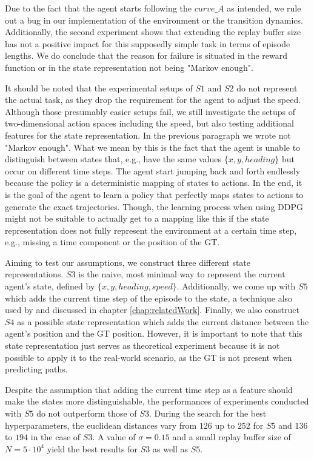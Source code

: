 Due to the fact that the agent starts following the $curve\_A$ as intended, we rule out a bug in our implementation of the environment or the transition dynamics. Additionally, the second experiment shows that extending the replay buffer size has not a positive impact for this supposedly simple task in terms of episode lengths. We do conclude that the reason for failure is situated in the reward function or in the state representation not being "Markov enough".
\par
It should be noted that the experimental setups of $S1$ and $S2$ do not represent the actual task, as they drop the requirement for the agent to adjust the speed. Although those presumably easier setups fail, we still investigate the setups of two-dimensional action spaces including the speed, but also testing additional features for the state representation. In the previous paragraph we wrote not "Markov enough". What we mean by this is the fact that the agent is unable to distinguish between states that, e.g., have the same values $\{x, y, heading\}$ but occur on different time steps. The agent start jumping back and forth endlessly because the policy is a deterministic mapping of states to actions. In the end, it is the goal of the agent to learn a policy that perfectly maps states to actions to generate the exact trajectories. Though, the learning process when using DDPG might not be suitable to actually get to a mapping like this if the state representation does not fully represent the environment at a certain time step, e.g., missing a time component or the position of the GT.
\par
Aiming to test our assumptions, we construct three different state representations. $S3$ is the naive, most minimal way to represent the current agent's state, defined by $\{x, y, heading, speed\}$. Additionally, we come up with $S5$ which  adds the current time step of the episode to the state, a technique also used by \cite{liu2019vessel} and discussed in chapter \ref{chap:relatedWork}. Finally, we also construct $S4$ as a possible state representation which adds the current distance between the agent's position and the GT position. However, it is important to note that this state representation just serves as theoretical experiment because it is not possible to apply it to the real-world scenario, as the GT is not present when predicting paths.
\par
Despite the assumption that adding the current time step as a feature should make the states more distinguishable, the performances of experiments conducted with $S5$ do not outperform those of $S3$. During the search for the best hyperparameters, the euclidean distances vary from $126$ up to $252$ for $S5$ and $136$ to $194$ in the case of $S3$. A value of $\sigma = 0.15$ and a small replay buffer size of $N=5 \cdot 10^4$ yield the best results for $S3$ as well as $S5$. 
